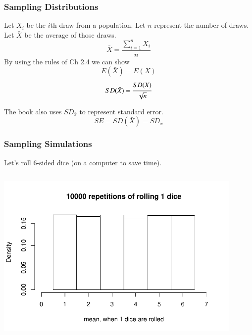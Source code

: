 \begin{frame}
\frametitle{Sampling Distributions}
Let $X_i$ be the $i$th draw from a population. Let $n$ represent the number of draws. Let $\bar{X}$ be the average of those draws.
$$\bar{X} = \frac{\sum\limits_{i=1}^n X_i}{n}$$
By using the rules of Ch 2.4 we can show
$$E(\bar{X}) = E(X)$$
$$SD(\bar{X}) = \cfrac{SD(X)}{\sqrt{n}} $$

The book also uses $SD_{\bar{x}}$ to represent standard error.
$$SE =SD(\bar{X}) = SD_{\bar{x}} $$

\end{frame}








\begin{frame}
\frametitle{Sampling Simulations}
Let's roll 6-sided dice (on a computer to save time). 
\vspace{-20pt}
\begin{columns}
\begin{column}{0.5\textwidth}
\begin{center}
\includegraphics[width=0.9\textwidth]{4-1_var_in_est/figures/six_sided_dice/rolls_by_1.pdf}


\end{center}
\end{column}
\end{columns}
\end{frame}
